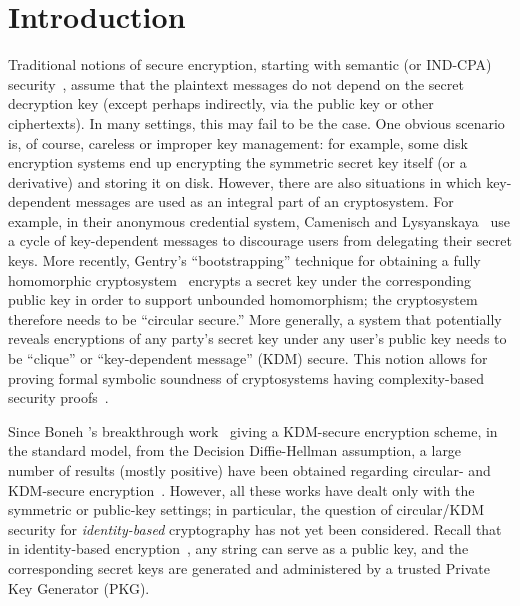 \section{Introduction}
\label{sec:intro}

Traditional notions of secure encryption, starting with semantic (or
IND-CPA) security~\cite{DBLP:journals/jcss/GoldwasserM84}, assume that
the plaintext messages do not depend on the secret decryption key
(except perhaps indirectly, via the public key or other ciphertexts).
In many settings, this may fail to be the case.  One obvious scenario
is, of course, careless or improper key management: for example, some
disk encryption systems end up encrypting the symmetric secret key
itself (or a derivative) and storing it on disk.  However, there are
also situations in which key-dependent messages are used as an
integral part of an cryptosystem.  For example, in their anonymous
credential system, Camenisch and
Lysyanskaya~\cite{DBLP:conf/eurocrypt/CamenischL01} use a cycle of
key-dependent messages to discourage users from delegating their
secret keys.  More recently, Gentry's ``bootstrapping'' technique for
obtaining a fully homomorphic
cryptosystem~\cite{DBLP:conf/stoc/Gentry09} encrypts a secret key
under the corresponding public key in order to support unbounded
homomorphism; the cryptosystem therefore needs to be ``circular
secure.''  More generally, a system that potentially reveals
encryptions of any party's secret key under any user's public key
needs to be ``clique'' or ``key-dependent message'' (KDM) secure.
This notion allows for proving formal symbolic soundness of
cryptosystems having complexity-based security
proofs~\cite{DBLP:conf/esorics/AdaoBHS05}.

Since Boneh \etal's breakthrough
work~\cite{DBLP:conf/crypto/BonehHHO08} giving a KDM-secure encryption
scheme, in the standard model, from the Decision Diffie-Hellman
assumption, a large number of results (mostly positive) have been
obtained regarding circular- and KDM-secure
encryption~\cite{DBLP:conf/tcc/HaitnerH09,DBLP:conf/crypto/ApplebaumCPS09,DBLP:conf/eurocrypt/BarakHHI10,DBLP:conf/crypto/BrakerskiG10,DBLP:conf/eurocrypt/Applebaum11,DBLP:conf/eurocrypt/MalkinTY11,DBLP:conf/tcc/BrakerskiGK11,DBLP:conf/crypto/BrakerskiV11}.
However, all these works have dealt only with the symmetric or
public-key settings; in particular, the question of circular/KDM
security for \emph{identity-based} cryptography has not yet been
considered.  Recall that in identity-based
encryption~\cite{DBLP:conf/crypto/Shamir84}, any string can serve as a
public key, and the corresponding secret keys are generated and
administered by a trusted Private Key Generator (PKG).

